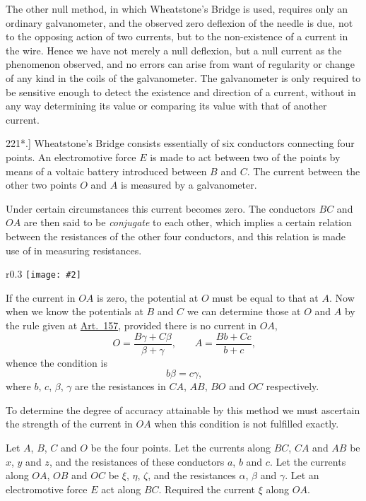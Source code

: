 \documentclass[12pt,oneside]{book}[2021/10/04]
\newcommand{\Runhead}[1]{\fancyhead[C]{\iffloatpage{}{\small#1}}}
\newcommand{\article}[1]{\phantomsection \label{art:#1}{#1.]}}
\newcommand{\wrapfig}[3]{
\begin{wrapfigure}{r}{#1\textwidth}
\centering
\texttt{[image: \#2]}
\caption*{\small #3}
\end{wrapfigure}}
\newcommand{\¬}{\hphantom{0}}
\begin{document}
The other null method, in which Wheatstone's Bridge is used,
requires only an ordinary galvanometer, and the observed zero
deflexion of the needle is due, not to the opposing action of two
currents, but to the non-existence of a current in the wire. Hence
we have not merely a null deflexion, but a null current as the
phenomenon observed, and no errors can arise from want of
regularity or change of any kind in the coils of the galvanometer.
The galvanometer is only required to be sensitive enough to detect
the existence and direction of a current, without in any way
determining its value or comparing its value with that of another
current.

\article{221*} Wheatstone's Bridge consists essentially of six conductors
connecting four points. An electromotive
force \(E\) is made to act between two of the
points by means of a voltaic battery introduced
between \(B\) and \(C\). The current
between the other two points \(O\) and \(A\) is
measured by a galvanometer.

Under certain circumstances this current
becomes zero. The conductors \(BC\) and \(OA\)
are then said to be \textit{conjugate} to each other,
which implies a certain relation between the resistances of the
other four conductors, and this relation is made use of in measuring
resistances.

\wrapfig{0.3}{204.png}{Fig. 48.}
If the current in \(OA\) is zero, the potential at \(O\) must be equal
to that at \(A\). Now when we know the potentials at \(B\) and \(C\) we
can determine those at \(O\) and \(A\) by the rule given at \hyperref[art:157*]{Art.\ 157},
provided there is no current in \(OA\),
\[
  O = \frac{B \gamma + C \beta}{ \beta + \gamma}\text{,} \qquad A = \frac{Bb + Cc}{b + c}\text{,}
\]
whence the condition is
\[
  b \beta = c \gamma\text{,}
\]
where \(b\), \(c\), \(\beta\), \(\gamma\) are the resistances in \(CA\), \(AB\), \(BO\) and \(OC\) respectively.

To determine the degree of accuracy attainable by this method
we must ascertain the strength of the current in \(OA\) when this
condition is not fulfilled exactly.
\Runhead{WHEATSTONE'S BRIDGE.}

Let \(A\), \(B\), \(C\) and \(O\) be the four points. Let the currents along
\(BC\), \(CA\) and \(AB\) be \(x\), \(y\) and \(z\), and the resistances of these
conductors \(a\), \(b\) and \(c\). Let the currents along \(OA\), \(OB\) and \(OC\) be
\(\xi\), \(\eta\), \(\zeta\), and the resistances \(\alpha\), \(\beta\) and \(\gamma\). Let an electromotive force
\(E\) act along \(BC\). Required the current \(\xi\) along \(OA\).
\end{document}
